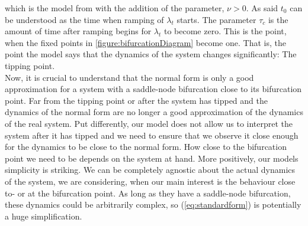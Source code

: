 which is the model from \cite[equation (2)]{Ditlevsen2023} with the addition of the parameter, $\nu>0$. As said $t_0$ can be understood as the time when ramping of $\lambda_t$ starts. The parameter $\tau_c$ is the amount of time after ramping begins for $\lambda_t$ to become zero. This is the point, when the fixed points in \ref{figure:bifurcationDiagram} become one. That is, the point the model says that the dynamics of the system changes significantly: The tipping point. \\Now, it is crucial to understand that the normal form is only a good approximation for a system with a saddle-node bifurcation close to its bifurcation point. Far from the tipping point or after the system has tipped and the dynamics of the normal form are no longer a good approximation of the dynamics of the real system. Put differently, our model does not allow us to interpret the system after it has tipped and we need to ensure that we observe it close enough for the dynamics to be close to the normal form. How close to the bifurcation point we need to be depends on the system at hand. More positively, our models simplicity is striking. We can be completely agnostic about the actual dynamics of the system, we are considering, when our main interest is the behaviour close to- or at the bifurcation point. As long as they have a saddle-node bifurcation, these dynamics could be arbitrarily complex, so (\ref{eq:standardform}) is potentially a huge simplification.
